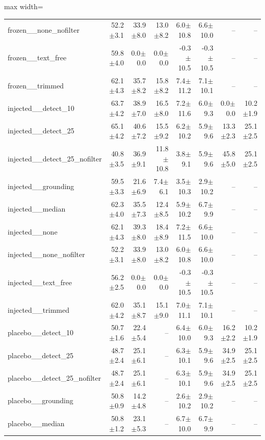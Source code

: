 \begin{table}[t]
{\begin{adjustbox}{max width=\linewidth}
\begin{tabular}{lrrrrrrr}
frozen\_\_none\_nofilter & 52.2$\pm$3.1 & 33.9$\pm$8.0 & 13.0$\pm$8.2 & 6.0$\pm$10.8 & 6.6$\pm$10.0 & -- & -- \\
frozen\_\_text\_free & 59.8$\pm$4.0 & 0.0$\pm$0.0 & 0.0$\pm$0.0 & -0.3$\pm$10.5 & -0.3$\pm$10.5 & -- & -- \\
frozen\_\_trimmed & 62.1$\pm$4.3 & 35.7$\pm$8.2 & 15.8$\pm$8.2 & 7.4$\pm$11.2 & 7.1$\pm$10.1 & -- & -- \\
injected\_\_detect\_10 & 63.7$\pm$4.2 & 38.9$\pm$7.0 & 16.5$\pm$8.0 & 7.2$\pm$11.6 & 6.0$\pm$9.3 & 0.0$\pm$0.0 & 10.2$\pm$1.9 \\
injected\_\_detect\_25 & 65.1$\pm$4.2 & 40.6$\pm$7.2 & 15.5$\pm$9.2 & 6.2$\pm$10.2 & 5.9$\pm$9.6 & 13.3$\pm$2.3 & 25.1$\pm$2.5 \\
injected\_\_detect\_25\_nofilter & 40.8$\pm$3.5 & 36.9$\pm$9.1 & 11.8$\pm$10.8 & 3.8$\pm$9.1 & 5.9$\pm$9.6 & 45.8$\pm$5.0 & 25.1$\pm$2.5 \\
injected\_\_grounding & 59.5$\pm$3.3 & 21.6$\pm$6.9 & 7.4$\pm$6.1 & 3.5$\pm$10.3 & 2.9$\pm$10.2 & -- & -- \\
injected\_\_median & 62.3$\pm$4.0 & 35.5$\pm$7.3 & 12.4$\pm$8.5 & 5.9$\pm$10.2 & 6.7$\pm$9.9 & -- & -- \\
injected\_\_none & 62.1$\pm$4.3 & 39.3$\pm$8.0 & 18.4$\pm$8.9 & 7.2$\pm$11.5 & 6.6$\pm$10.0 & -- & -- \\
injected\_\_none\_nofilter & 52.2$\pm$3.1 & 33.9$\pm$8.0 & 13.0$\pm$8.2 & 6.0$\pm$10.8 & 6.6$\pm$10.0 & -- & -- \\
injected\_\_text\_free & 56.2$\pm$2.5 & 0.0$\pm$0.0 & 0.0$\pm$0.0 & -0.3$\pm$10.5 & -0.3$\pm$10.5 & -- & -- \\
injected\_\_trimmed & 62.0$\pm$4.2 & 35.1$\pm$8.7 & 15.1$\pm$9.0 & 7.0$\pm$11.1 & 7.1$\pm$10.1 & -- & -- \\
placebo\_\_detect\_10 & 50.7$\pm$1.6 & 22.4$\pm$5.4 & -- & 6.4$\pm$10.0 & 6.0$\pm$9.3 & 16.2$\pm$2.2 & 10.2$\pm$1.9 \\
placebo\_\_detect\_25 & 48.7$\pm$2.4 & 25.1$\pm$6.1 & -- & 6.3$\pm$10.1 & 5.9$\pm$9.6 & 34.9$\pm$2.5 & 25.1$\pm$2.5 \\
placebo\_\_detect\_25\_nofilter & 48.7$\pm$2.4 & 25.1$\pm$6.1 & -- & 6.3$\pm$10.1 & 5.9$\pm$9.6 & 34.9$\pm$2.5 & 25.1$\pm$2.5 \\
placebo\_\_grounding & 50.8$\pm$0.9 & 14.2$\pm$4.8 & -- & 2.6$\pm$10.2 & 2.9$\pm$10.2 & -- & -- \\
placebo\_\_median & 50.8$\pm$1.2 & 23.1$\pm$5.3 & -- & 6.7$\pm$10.0 & 6.7$\pm$9.9 & -- & -- \\

\end{tabular}
\end{adjustbox}}
\end{table}
